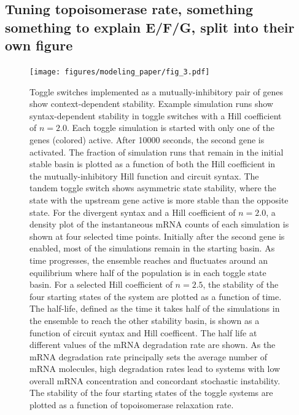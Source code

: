 \documentclass[11pt]{article}
\begin{document}
\subsection{Tuning topoisomerase rate, something something to explain E/F/G, split into their own figure}

\begin{figure}[h]
    \centering
    {\texttt{[image: figures/modeling\_paper/fig\_3.pdf]}
    \label{fig:toggle_cartoon} %
    \label{fig:toggle_orientation_examples}
    \label{fig:toggle_basin_stability}
    \label{fig:toggle_basin_stability_over_time}
    \label{fig:toggle_stable_frac_n_2.5}
    \label{fig:toggle_half_life_vs_hill}
    \label{fig:toggle_half_life_vs_mRNA_deg}
    \label{fig:toggle_vs_topo_rate}
    }
\end{figure}
\begin{figure}[h]
    \ContinuedFloat
    \caption{Toggle switches implemented as a mutually-inhibitory pair of genes show context-dependent stability.
         Example simulation runs show syntax-dependent stability in toggle switches with a Hill coefficient of \(n = 2.0\). Each toggle simulation is started with only one of the genes (colored) active. After 10000 seconds, the second gene is activated.
         The fraction of simulation runs that remain in the initial stable basin is plotted as a function of both the Hill coefficient in the mutually-inhibitory Hill function and circuit syntax. The tandem toggle switch shows asymmetric state stability, where the state with the upstream gene active is more stable than the opposite state.
         For the divergent syntax and a Hill coefficient of \(n = 2.0\), a density plot of the instantaneous mRNA counts of each simulation is shown at four selected time points. Initially after the second gene is enabled, most of the simulations remain in the starting basin. As time progresses, the ensemble reaches and fluctuates around an equilibrium where half of the population is in each toggle state basin.
         For a selected Hill coefficient of \(n = 2.5\), the stability of the four starting states of the system are plotted as a function of time.
         The half-life, defined as the time it takes half of the simulations in the ensemble to reach the other stability basin, is shown as a function of circuit syntax and Hill coefficent.
         The half life at different values of the mRNA degradation rate are shown. As the mRNA degradation rate principally sets the average number of mRNA molecules, high degradation rates lead to systems with low overall mRNA concentration and concordant stochastic instability.
         The stability of the four starting states of the toggle systems are plotted as a function of topoisomerase relaxation rate.
    } \label{fig:top:toggle_switch}
\end{figure}
\end{document}
